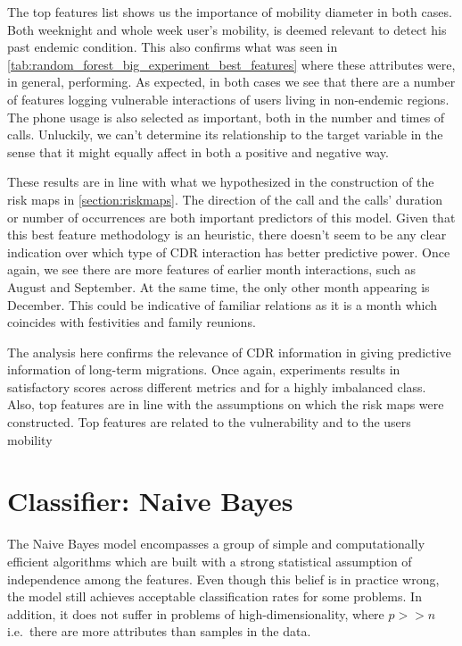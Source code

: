 The top features list shows us the importance of mobility diameter in both cases.
Both weeknight and whole week user's mobility, is deemed relevant to detect his past endemic condition.
This also confirms what was seen in \cref{tab:random_forest_big_experiment_best_features} where these attributes were, in general, performing.
As expected, in both cases we see that there are a number of features logging vulnerable interactions of users living in non-endemic regions.
The phone usage is also selected as important, both in the number and times of calls.
Unluckily, we can't determine its relationship to the target variable in the sense that it might equally affect in both a positive and negative way.

These results are in line with what we hypothesized in the construction of the risk maps in \cref{section:riskmaps}.
The direction of the call and the calls' duration or number of occurrences are both important predictors of this model.
Given that this best feature methodology is an heuristic, there doesn't seem to be any clear indication over which type of CDR interaction has better predictive power.
Once again, we see there are more features of earlier month interactions, such as August and September.
At the same time, the only other month appearing is December.
This could be indicative of familiar relations as it is a month which coincides with festivities and family reunions.

The analysis here confirms the relevance of CDR information in giving predictive information of long-term migrations.
Once again, experiments results in satisfactory scores across different metrics and for a highly imbalanced class.
Also, top features are in line with the assumptions on which the risk maps were constructed.
Top features are related to the vulnerability and to the users mobility



\section{Classifier: Naive Bayes}

The Naive Bayes model encompasses a group of simple and computationally efficient algorithms which are built with a strong statistical assumption of independence among the features. 
Even though this belief is in practice wrong, the model still achieves acceptable classification rates for some problems. 
In addition, it does not suffer in problems of high-dimensionality, where $p >> n$ i.e.\ there are more attributes than samples in the data.

